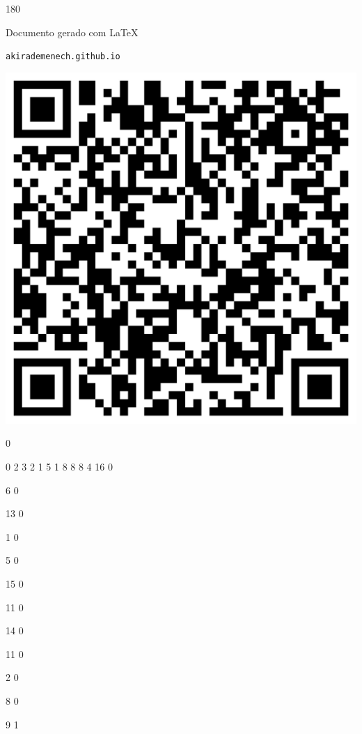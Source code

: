 \documentclass[12pt]{article}
\begin{document}
	\begin{turn}{180}	
		\begin{minipage}{\textwidth}		  
		  Documento gerado com \LaTeX			
		  
		  \texttt{akirademenech.github.io}

		  \includegraphics[height=0.3\textheight]{2e-2.pdf}

		\end{minipage}	
	\end{turn}  
		  
		\vfill  
		  
{
	0	%

	0	%
	2	%
	3	%
	2	%
	1	%
	5	%
	1	%
	8	%
	8	%
	8	%
	4	%
	16	%
	0	%

	6	%
	0	%

	13	%
	0	%

	1	%
	0	%

	5	%
	0	%

	15	%
	0	%

	11	%
	0	%

	14	%
	0	%

	11	%
	0	%

	2	%
	0	%

	8	%
	0	%

	9	%
	1	%
}	  
		    	
\end{document}
